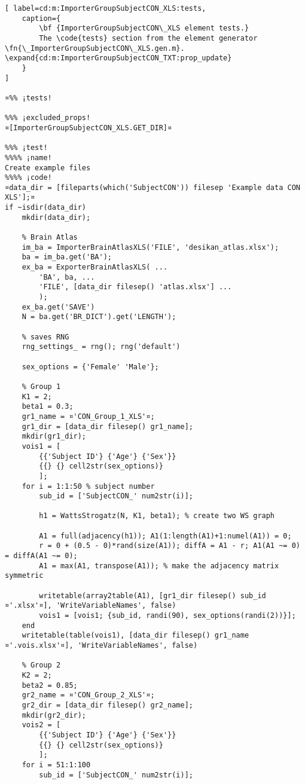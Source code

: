 \documentclass{tufte-handout}
\begin{document}
\clearpage
\begin{lstlisting}[	label=cd:m:ImporterGroupSubjectCON_XLS:tests,
	caption={
		\bf {ImporterGroupSubjectCON\_XLS element tests.}
		The \code{tests} section from the element generator \fn{\_ImporterGroupSubjectCON\_XLS.gen.m}. \expand{cd:m:ImporterGroupSubjectCON_TXT:prop_update}
	}
]

¤%% ¡tests!

%%% ¡excluded_props!
¤[ImporterGroupSubjectCON_XLS.GET_DIR]¤

%%% ¡test!
%%%% ¡name!
Create example files
%%%% ¡code!
¤data_dir = [fileparts(which('SubjectCON')) filesep 'Example data CON XLS'];¤
if ~isdir(data_dir)
    mkdir(data_dir);

    % Brain Atlas
    im_ba = ImporterBrainAtlasXLS('FILE', 'desikan_atlas.xlsx');
    ba = im_ba.get('BA');
    ex_ba = ExporterBrainAtlasXLS( ...
        'BA', ba, ...
        'FILE', [data_dir filesep() 'atlas.xlsx'] ...
        );
    ex_ba.get('SAVE')
    N = ba.get('BR_DICT').get('LENGTH');

    % saves RNG
    rng_settings_ = rng(); rng('default')

    sex_options = {'Female' 'Male'};

    % Group 1
    K1 = 2; 
    beta1 = 0.3; 
    gr1_name = ¤'CON_Group_1_XLS'¤;
    gr1_dir = [data_dir filesep() gr1_name];
    mkdir(gr1_dir);
    vois1 = [
        {{'Subject ID'} {'Age'} {'Sex'}}
        {{} {} cell2str(sex_options)}
        ];
    for i = 1:1:50 % subject number
        sub_id = ['SubjectCON_' num2str(i)];

        h1 = WattsStrogatz(N, K1, beta1); % create two WS graph

        A1 = full(adjacency(h1)); A1(1:length(A1)+1:numel(A1)) = 0; 
        r = 0 + (0.5 - 0)*rand(size(A1)); diffA = A1 - r; A1(A1 ~= 0) = diffA(A1 ~= 0); 
        A1 = max(A1, transpose(A1)); % make the adjacency matrix symmetric

        writetable(array2table(A1), [gr1_dir filesep() sub_id ¤'.xlsx'¤], 'WriteVariableNames', false)
        vois1 = [vois1; {sub_id, randi(90), sex_options(randi(2))}];
    end
    writetable(table(vois1), [data_dir filesep() gr1_name ¤'.vois.xlsx'¤], 'WriteVariableNames', false)

    % Group 2
    K2 = 2; 
    beta2 = 0.85; 
    gr2_name = ¤'CON_Group_2_XLS'¤;
    gr2_dir = [data_dir filesep() gr2_name];
    mkdir(gr2_dir);
    vois2 = [
        {{'Subject ID'} {'Age'} {'Sex'}}
        {{} {} cell2str(sex_options)}
        ];
    for i = 51:1:100
        sub_id = ['SubjectCON_' num2str(i)];


\end{lstlisting}
\end{document}

